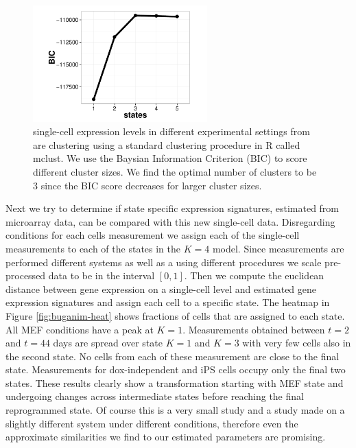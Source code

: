 \begin{figure}[!t]
  \centering
  \includegraphics[width=0.6\textwidth]{pics/yossi_mclust.pdf}
  \caption{single-cell expression levels in different experimental settings from \cite{Buganim:2012hp} are clustering using a standard clustering procedure in R called mclust. We use the Baysian Information Criterion (BIC) to score different cluster sizes. We find the optimal number of clusters to be $3$ since the BIC score decreases for larger cluster sizes.}
  \label{fig:buganim-mclust}
\end{figure}

Next we try to determine if state specific expression signatures, estimated from microarray data, can be compared with this new single-cell data. Disregarding conditions for each cells measurement we assign each of the single-cell measurements to each of the states in the $K=4$ model. Since measurements are performed  different systems as well as a using different procedures we scale pre-processed data to be in the interval $[0, 1]$. Then we compute the euclidean distance between gene expression on a single-cell level and estimated gene expression signatures and assign each cell to a specific state. The heatmap in Figure \ref{fig:buganim-heat} shows fractions of cells that are assigned to each state. All MEF conditions have a peak at $K=1$. Measurements obtained between $t=2$ and $t=44$ days are spread over state $K=1$ and $K=3$ with very few cells also in the second state. No cells from each of these measurement are close to the final state. Measurements for dox-independent and iPS cells occupy only the final two states. These results clearly show a transformation starting with MEF state and undergoing changes across intermediate states before reaching the final reprogrammed state. Of course this is a very small study and a study made on a slightly different system under different conditions, therefore even the approximate similarities we find to our estimated parameters are promising. 


